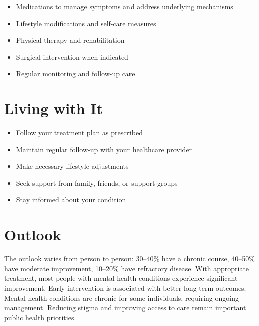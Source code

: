 \begin{itemize}[noitemsep]
  \item Medications to manage symptoms and address underlying mechanisms
  \item Lifestyle modifications and self-care measures
  \item Physical therapy and rehabilitation
  \item Surgical intervention when indicated
  \item Regular monitoring and follow-up care
\end{itemize}
\section{Living with It}
\begin{itemize}[noitemsep]
  \item Follow your treatment plan as prescribed
  \item Maintain regular follow-up with your healthcare provider
  \item Make necessary lifestyle adjustments
  \item Seek support from family, friends, or support groups
  \item Stay informed about your condition
\end{itemize}
\section{Outlook}
The outlook varies from person to person: 30--40\% have a chronic course, 40--50\% have moderate improvement, 10--20\% have refractory disease. With appropriate treatment, most people with mental health conditions experience significant improvement. Early intervention is associated with better long-term outcomes. Mental health conditions are chronic for some individuals, requiring ongoing management. Reducing stigma and improving access to care remain important public health priorities.

